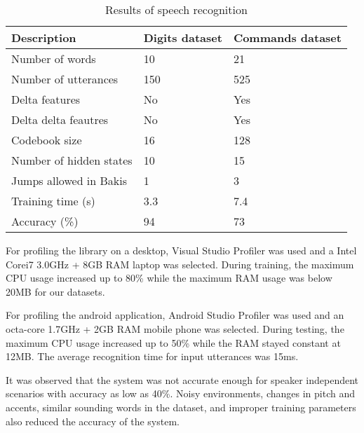 \begin{table}[H]
    \centering
    \begin{tabular}{lll}
    \hline
    Description           & Digits dataset & Commands dataset \\
    \hline
    Number of words       &  10     & 21 \\
    Number of utterances  &  150    & 525 \\
    \hline
    Delta features        &  No     & Yes \\
    Delta delta feautres  &  No     & Yes \\
    Codebook size         &  16  & 128 \\
    Number of hidden states  &  10 & 15 \\
    Jumps allowed in Bakis &  1 & 3 \\
    \hline
    Training time (s)     &  3.3 & 7.4 \\
    Accuracy (\%)         &  94 & 73 \\
    \hline
    \end{tabular}
    \caption{Results of speech recognition}
\end{table}   

For profiling the library on a desktop, Visual Studio Profiler was used and a Intel Corei7 3.0GHz + 8GB RAM laptop was selected. During training, the maximum CPU usage increased up to 80\% while the maximum RAM usage was below 20MB for our datasets.

For profiling the android application, Android Studio Profiler was used and an octa-core 1.7GHz + 2GB RAM mobile phone was selected. During testing, the maximum CPU usage increased up to 50\% while the RAM stayed constant at 12MB. The average recognition time for input utterances was 15ms.

It was observed that the system was not accurate enough for speaker independent scenarios with accuracy as low as 40\%. Noisy environments, changes in pitch and accents, similar sounding words in the dataset, and improper training parameters also reduced the accuracy of the system.